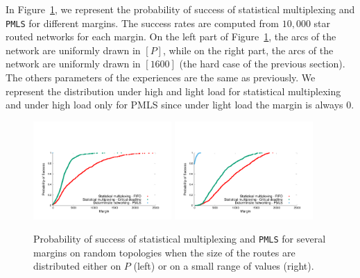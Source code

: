 \documentclass[a4paper,10pt]{article}
\newcommand\PMLS{\texttt{PMLS}\xspace}
\begin{document}
	    
     In Figure~\ref{fig:sto}, we represent the probability of success of statistical multiplexing and \PMLS for different margins. The success rates are computed from $10,000$ star routed networks for each margin. On the left part of Figure~\ref{fig:sto}, the arcs of the network are uniformly drawn in $[P]$, while on the right part, the arcs of the network are uniformly drawn in $[1600]$ (the hard case of the previous section). The others parameters of the experiences are the same as previously. We represent the distribution under high and light load for statistical multiplexing and under high load only for PMLS since under light load the margin is always $0$. 
     
    \begin{figure}
    
   

       \begin{center}
      \includegraphics[width = 0.47\textwidth]{stochasticdistrib.pdf}
      \includegraphics[width = 0.47\textwidth]{stochastic.pdf}
     
       \end{center}
  \caption{Probability of success of statistical multiplexing and \PMLS for several margins on random topologies when the size of the routes are distributed either on $P$ (left) or on a small range of values (right).}
      \label{fig:sto} 
      \end{figure}
      
\end{document}
